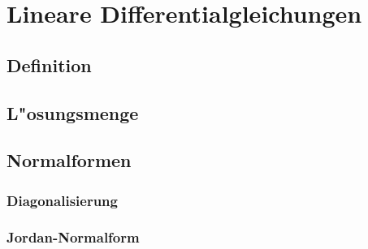 %
%
%
\chapter{Lineare Differentialgleichungen\label{chapter:linear}}
\lhead{}
\section{Definition}
\section{L"osungsmenge}
\section{Normalformen}
\subsection{Diagonalisierung}
\subsection{Jordan-Normalform}

